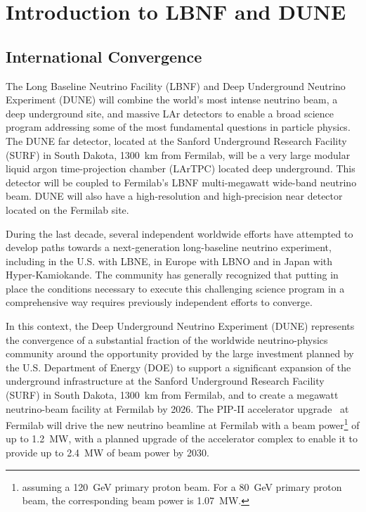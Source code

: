 \chapter{Introduction to LBNF and DUNE}
\label{ch:project-overview}

\section{International Convergence}

The Long Baseline Neutrino Facility (LBNF) and Deep Underground Neutrino Experiment (DUNE) will combine the world's most intense neutrino beam, 
a deep underground site, and massive LAr detectors to enable a broad science program addressing some of the most fundamental questions in particle physics. 
The DUNE far detector, located at the Sanford Underground Research 
Facility (SURF) in South Dakota, \SI{1300}{\km} from Fermilab, 
will be a very large modular liquid argon time-projection chamber (LArTPC) located deep underground. This detector will be coupled to Fermilab's LBNF multi-megawatt  %
wide-band neutrino beam.   DUNE will also have a high-resolution and high-precision near detector located on the Fermilab site.

During the last decade, several independent worldwide efforts have attempted to develop paths towards a next-generation long-baseline neutrino experiment, including in the U.S. with LBNE, in Europe with LBNO and in Japan with Hyper-Kamiokande. The community has %
generally recognized that putting in place %
the conditions necessary to 
execute this challenging science program in a comprehensive way requires previously independent 
efforts to converge. 

In this context, the Deep Underground Neutrino Experiment (DUNE) represents the convergence of a substantial fraction of the worldwide neutrino-physics community around the 
opportunity provided by the 
large investment planned by the U.S. Department of Energy (DOE) to support 
a significant expansion of the underground infrastructure at the Sanford Underground Research 
Facility (SURF) in South Dakota, \SI{1300}{\km} from Fermilab, and to create a megawatt neutrino-beam facility at Fermilab by 2026.  The PIP-II accelerator upgrade~\cite{pip2-2013} at 
Fermilab will drive the new neutrino beamline at Fermilab with a beam power\footnote{assuming a \SI{120}{\GeV} primary proton beam. For a \SI{80}{\GeV} primary proton beam, the corresponding beam power is \SI{1.07}{\MW}.} of up to \SI{1.2}{\MW}, with a planned upgrade 
of the accelerator complex to enable it to provide up to \SI{2.4}{\MW} of beam power by 2030.  

